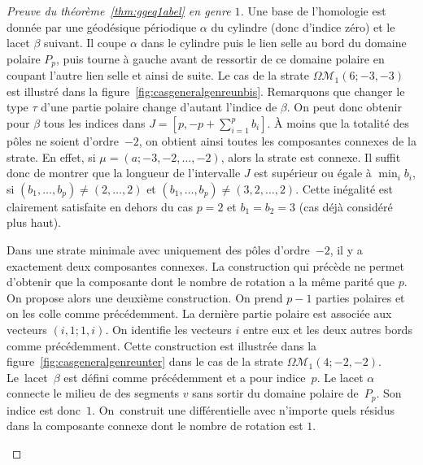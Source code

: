 \documentclass[JEP,XML,SOM,Unicode,francais,NoFloatCountersInSection,published]{cedram}
\let\mathcal\mathscr
\newcommand{\omoduli}[1][g]{{\Omega\mathcal M}_{\!#1}}
\theoremstyle{definition}
\begin{document}
\begin{proof}[Preuve du théorème~\ref{thm:ggeq1abel} en genre $1$]
Une base de l'homologie est donnée par une géodésique périodique $\alpha$ du cylindre (donc d'indice zéro) et le lacet $\beta$ suivant. Il coupe $\alpha$ dans le cylindre puis le lien selle au bord du domaine polaire $P_{p}$, puis tourne à gauche avant de ressortir de ce domaine polaire en coupant l'autre lien selle et ainsi de suite. Le cas de la strate $\omoduli[1](6;-3,-3)$ est illustré dans la figure~\ref{fig:casgeneralgenreunbis}.
Remarquons que changer le type $\tau$ d'une partie polaire change d'autant l'indice de $\beta$. On peut donc obtenir pour $\beta$ tous les indices dans $J=\left[ p,-p+\sum_{i=1}^{p} b_{i}\right]$. À moins que la totalité des pôles ne soient d'ordre~$-2$, on obtient ainsi toutes les composantes connexes de la strate. En effet, si $\mu=(a;-3,-2,\dots,-2)$, alors la strate est connexe. Il suffit donc de montrer que la longueur de l'intervalle $J$ est supérieur ou égale à $\min_{i} b_{i}$, si $(b_{1},\dots,b_{p})\neq (2,\dots,2)$ et $(b_{1},\dots,b_{p})\neq (3,2,\dots,2)$. Cette inégalité est clairement satisfaite en dehors du cas $p=2$ et $b_{1}=b_{2}=3$ (cas déjà considéré plus haut).

Dans une strate minimale avec uniquement des pôles d'ordre~$-2$, il y a exactement deux composantes connexes. La construction qui précède ne permet d'obtenir que la composante dont le nombre de rotation a la même parité que $p$.
On propose alors une deuxième construction. On prend $p-1$ parties polaires et on les colle comme précédemment. La dernière partie polaire est associée aux vecteurs $(i,1;1,i)$.
On identifie les vecteurs $i$ entre eux et les deux autres bords comme précédemment. Cette construction est illustrée dans la figure~\ref{fig:casgeneralgenreunter} dans le cas de la strate $\omoduli[1](4;-2,-2)$.
Le~lacet~$\beta$ est défini comme précédemment et a pour indice~$p$. Le lacet $\alpha$ connecte le milieu de des segments $v$ sans sortir du domaine polaire de~$P_{p}$. Son indice est donc~$1$. On~construit une différentielle avec n'importe quels résidus dans la composante connexe dont le nombre de rotation est $1$.

\begin{figure}[htb]
\center
{}
\end{figure}
\end{proof}
\end{document}
